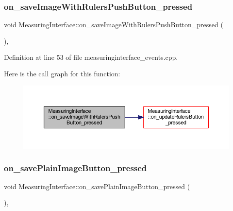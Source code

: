 \subsubsection{\texorpdfstring{on\_saveImageWithRulersPushButton\_pressed}{on\_saveImageWithRulersPushButton\_pressed}}
{\footnotesize\ttfamily void Measuring\+Interface\+::on\+\_\+save\+Image\+With\+Rulers\+Push\+Button\+\_\+pressed (\begin{DoxyParamCaption}{ }\end{DoxyParamCaption})\hspace{0.3cm}{\ttfamily [private]}, {\ttfamily [slot]}}



Definition at line 53 of file measuringinterface\+\_\+events.\+cpp.

Here is the call graph for this function\+:
\nopagebreak
\begin{figure}[H]
\begin{center}
\leavevmode
\includegraphics[width=350pt]{class_measuring_interface_a87fcf4623df1c9af6663fe236bb3dd0e_cgraph}
\end{center}
\end{figure}
\mbox{\label{class_measuring_interface_abbb97e89e646574ba20297556e666cc7}} 
\subsubsection{\texorpdfstring{on\_savePlainImageButton\_pressed}{on\_savePlainImageButton\_pressed}}
{\footnotesize\ttfamily void Measuring\+Interface\+::on\+\_\+save\+Plain\+Image\+Button\+\_\+pressed (\begin{DoxyParamCaption}{ }\end{DoxyParamCaption})\hspace{0.3cm}{\ttfamily [private]}, {\ttfamily [slot]}}



